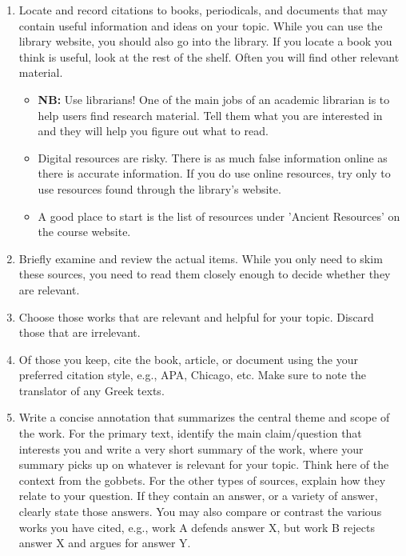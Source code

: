\documentclass[oneside]{article}
\begin{document}
\begin{enumerate}
\def\labelenumi{\arabic{enumi}.}
\item
  Locate and record citations to books, periodicals, and documents that
  may contain useful information and ideas on your topic. While you can
  use the library website, you should also go into the library. If you
  locate a book you think is useful, look at the rest of the shelf.
  Often you will find other relevant material.

  \begin{itemize}
  \item
    \textbf{NB:} Use librarians! One of the main jobs of an academic
    librarian is to help users find research material. Tell them what
    you are interested in and they will help you figure out what to
    read.
  \item
    Digital resources are risky. There is as much false information
    online as there is accurate information. If you do use online
    resources, try only to use resources found through the library's
    website. 
  \item
    A good place to start is the list of resources under 'Ancient
    Resources' on the course website.
  \end{itemize}
\item
  Briefly examine and review the actual items. While you only need to
  skim these sources, you need to read them closely enough to decide
  whether they are relevant.
\item
  Choose those works that are relevant and helpful for your topic.
  Discard those that are irrelevant.
\item
  Of those you keep, cite the book, article, or document using the your
  preferred citation style, e.g., APA, Chicago, etc. Make sure to note
  the translator of any Greek texts.
\item
  Write a concise annotation that summarizes the central theme and scope
  of the work. For the primary text,  identify the main
  claim/question that interests you and write a very short summary of
  the work, where your summary picks up on whatever is
  relevant for your topic. Think here of the context from the gobbets.
  For the other types of sources, explain how they relate to your
  question. If they contain an answer, or a variety of answer, clearly
  state those answers. You may also compare or contrast the various works you
  have cited, e.g., work A defends answer X, but work B rejects answer X
  and argues for answer Y. 
\end{enumerate}
\end{document}
